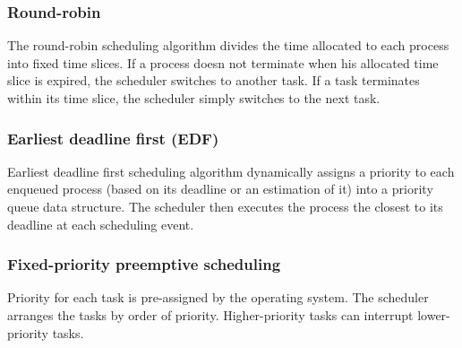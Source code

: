\subsubsection{Round-robin}
The round-robin scheduling algorithm divides the time allocated to each process into fixed time slices.
If a process doesn not terminate when his allocated time slice is expired, the scheduler switches to another task.
If a task terminates within its time slice, the scheduler simply switches to the next task.

\subsubsection{Earliest deadline first (EDF)}
Earliest deadline first scheduling algorithm dynamically assigns a priority
    to each enqueued process (based on its deadline or an estimation of it) into a priority queue data structure.
The scheduler then executes the process the closest to its deadline at each scheduling event.

\subsubsection{Fixed-priority preemptive scheduling}
Priority for each task is pre-assigned by the operating system.
The scheduler arranges the tasks by order of priority.
Higher-priority tasks can interrupt lower-priority tasks.

